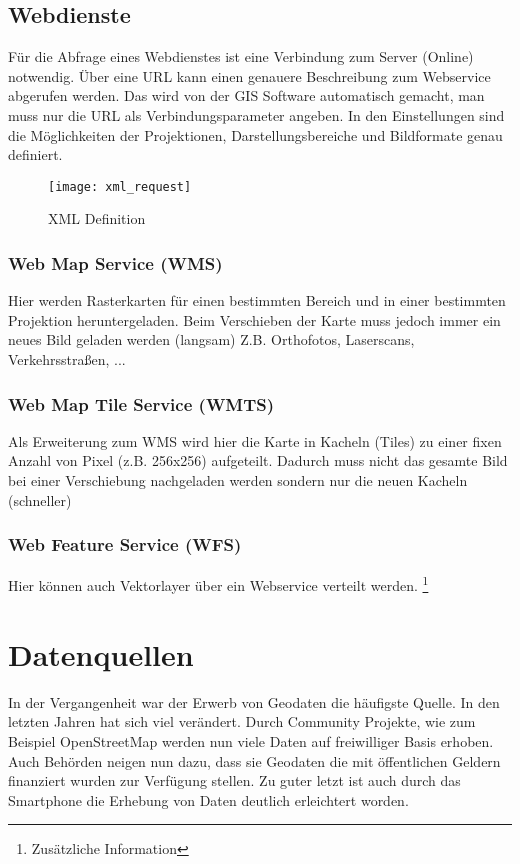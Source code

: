 \documentclass[11pt,fleqn]{book} %
\begin{document}
\section{Webdienste}
F\"ur die Abfrage eines Webdienstes ist eine Verbindung zum Server (Online) notwendig. \"Uber eine URL kann einen genauere Beschreibung zum Webservice abgerufen werden. Das wird von der GIS Software automatisch gemacht, man muss nur die URL als Verbindungsparameter angeben. In den Einstellungen sind die Möglichkeiten der Projektionen, Darstellungsbereiche und Bildformate genau definiert. 
\begin{figure}[h]
\centering\texttt{[image: xml\_request]}
\caption{XML Definition}
\end{figure}
\subsection{Web Map Service (WMS)}
Hier werden Rasterkarten für einen bestimmten Bereich und in einer bestimmten Projektion heruntergeladen. Beim Verschieben der Karte muss jedoch immer ein neues Bild geladen werden (langsam)  Z.B. Orthofotos, Laserscans, Verkehrsstra{\ss}en, ...


\subsection{Web Map Tile Service (WMTS)}
Als Erweiterung zum WMS wird hier die Karte in Kacheln (Tiles) zu einer fixen Anzahl von Pixel (z.B. 256x256) aufgeteilt. Dadurch muss nicht das gesamte Bild bei einer Verschiebung nachgeladen werden sondern nur die neuen Kacheln (schneller) 


\subsection{Web Feature Service (WFS)}
Hier k\"onnen auch Vektorlayer \"uber ein Webservice verteilt werden.
\footnote{Zus\"atzliche Information}


\chapter{Datenquellen}
In der Vergangenheit war der Erwerb von Geodaten die häufigste Quelle. In den letzten Jahren hat sich viel ver\"andert. Durch Community Projekte, wie zum Beispiel OpenStreetMap werden nun viele Daten auf freiwilliger Basis erhoben. Auch Beh\"orden neigen nun dazu, dass sie Geodaten die mit \"offentlichen Geldern finanziert wurden zur Verf\"ugung stellen. Zu guter letzt ist auch durch das Smartphone die Erhebung von Daten deutlich erleichtert worden.
\end{document}
